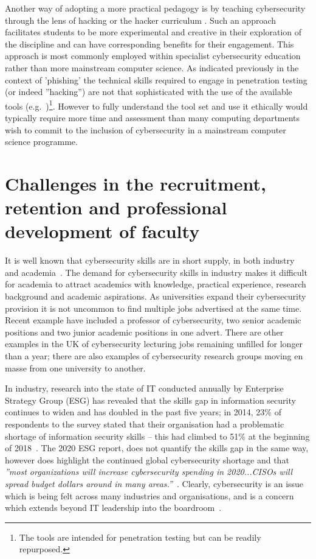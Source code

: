\documentclass[conference]{IEEEtran}
\begin{document}
Another way of adopting a more practical pedagogy is by teaching cybersecurity through the lens of hacking or the hacker curriculum \cite{bratus2010teaching}. Such an approach facilitates students to be more experimental and creative in their exploration of the discipline and can have corresponding benefits for their engagement. This approach is most commonly employed within specialist cybersecurity education rather than more mainstream computer science. As indicated previously in the context of 'phishing' the technical skills required to engage in penetration testing (or indeed ''hacking'') are not that sophisticated with the use of the available tools (e.g.~\cite{KaliLinux,metasploit})\footnote{The tools are intended for penetration testing but can be readily repurposed. }. However to fully understand the tool set and use it ethically would typically require more time and assessment than many computing departments wish to commit to the inclusion of cybersecurity in a mainstream computer science programme.

\section{Challenges in the recruitment, retention and professional development of faculty}\label{sec:staff}
It is well known that cybersecurity skills are in short supply, in both industry~\cite{Ackerman2019a} and academia~\cite{schneider2013,endicott2018searching}. The demand for cybersecurity skills in industry makes it difficult for academia to attract academics with knowledge, practical experience, research background and academic aspirations. As universities expand their cybersecurity provision it is not uncommon to find multiple jobs advertised at the same time. Recent example have included a professor of cybersecurity, two senior academic positions and two junior academic positions in one advert. There are other examples in the UK of cybersecurity lecturing jobs remaining unfilled for longer than a year; there are also examples of cybersecurity research groups moving en masse from one university to another.

In industry,
research into the state of IT conducted annually by Enterprise Strategy Group (ESG) has revealed that the skills gap in information security continues to widen and has doubled in the past five years; in 2014, 23\% of respondents to the survey stated that their organisation had a problematic shortage of information security skills -- this had climbed to 51\% at the beginning of 2018~\cite{ESG:2018}. The 2020 ESG report, does not quantify the skills gap in the same way, however does highlight the continued global cybersecurity shortage and that {\em''most organizations will increase cybersecurity spending in 2020...CISOs will spread budget dollars around in many areas.''}~\cite[p.1]{ESG:2020}. Clearly, cybersecurity is an issue which is being felt across many industries and organisations, and is a concern which extends beyond IT leadership into the boardroom~\cite{Ackerman2019a}.
\end{document}
